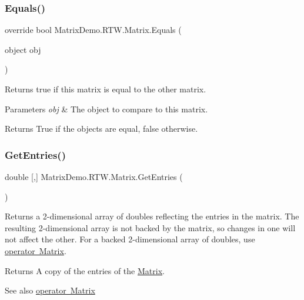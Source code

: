 \subsubsection{\texorpdfstring{Equals()}{Equals()}}
{\footnotesize\ttfamily override bool Matrix\+Demo.\+R\+T\+W.\+Matrix.\+Equals (\begin{DoxyParamCaption}\item[{object}]{obj }\end{DoxyParamCaption})}



Returns true if this matrix is equal to the other matrix. 


\begin{DoxyParams}{Parameters}
{\em obj} & The object to compare to this matrix.\\
\hline
\end{DoxyParams}
\begin{DoxyReturn}{Returns}
True if the objects are equal, false otherwise.
\end{DoxyReturn}
\mbox{\label{class_matrix_demo_1_1_r_t_w_1_1_matrix_a9f6f8e0e7acfbdd55852f258daf68b8f}} 
\subsubsection{\texorpdfstring{Get\+Entries()}{GetEntries()}}
{\footnotesize\ttfamily double \mbox{[},\mbox{]} Matrix\+Demo.\+R\+T\+W.\+Matrix.\+Get\+Entries (\begin{DoxyParamCaption}{ }\end{DoxyParamCaption})}



Returns a 2-\/dimensional array of doubles reflecting the entries in the matrix. The resulting 2-\/dimensional array is not backed by the matrix, so changes in one will not affect the other. For a backed 2-\/dimensional array of doubles, use \mbox{\hyperlink{class_matrix_demo_1_1_r_t_w_1_1_matrix_a0c737f7e6b54edac4d26b4f1c595ee92}{operator Matrix}}. 

\begin{DoxyReturn}{Returns}
A copy of the entries of the \mbox{\hyperlink{class_matrix_demo_1_1_r_t_w_1_1_matrix}{Matrix}}.
\end{DoxyReturn}
\begin{DoxySeeAlso}{See also}
\mbox{\hyperlink{class_matrix_demo_1_1_r_t_w_1_1_matrix_a0c737f7e6b54edac4d26b4f1c595ee92}{operator Matrix}}


\end{DoxySeeAlso}
\mbox{\label{class_matrix_demo_1_1_r_t_w_1_1_matrix_ad7f43b0fc8f78f4deb76238d99749d1d}} 
